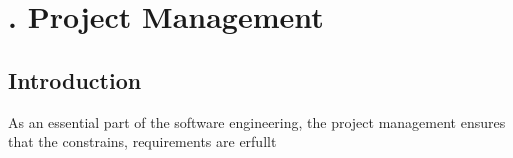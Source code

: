 \chapter[Project Management]{\thechapter. Project Management}
\section{Introduction}
As an essential part of the software engineering, the project management ensures that the constrains, requirements are erfullt 











